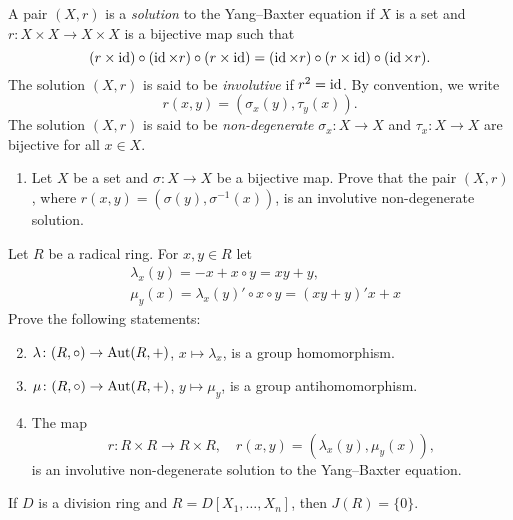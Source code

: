\begin{bonus}
A pair $(X,r)$ is a \emph{solution} to the 
Yang--Baxter equation if $X$ is a set and
$r\colon X\times X\to X\times X$ is a bijective map such that  
\[
	(r\times\operatorname{id})\circ (\operatorname{id}\times r)\circ (r\times\operatorname{id})
	=(\operatorname{id}\times r)\circ (r\times\operatorname{id})\circ (\operatorname{id}\times r).
\]
The solution $(X,r)$ is said to be \emph{involutive} 
if $r^2=\operatorname{id}$. By convention, we write 
\[
	r(x,y)=(\sigma_x(y),\tau_y(x)).
\]
The solution $(X,r)$ is said to be \emph{non-degenerate}  
$\sigma_x\colon X\to X$ and 
$\tau_x\colon X\to X$ are bijective for all $x\in X$.

\begin{enumerate}
    \item Let $X$ be a set and $\sigma\colon X\to X$ be a bijective map. Prove that  
          the pair $(X,r)$, where 
          $r(x,y)=(\sigma(y),\sigma^{-1}(x))$, is an involutive non-degenerate solution. 
\end{enumerate}
Let $R$ be a radical ring. For $x,y\in R$ let 
\begin{align*}
	&\lambda_x(y)=-x+x\circ y=xy+y,\\
	&\mu_y(x)=\lambda_x(y)'\circ x\circ y=(xy+y)'x+x
\end{align*}
Prove the following statements:
\begin{enumerate}
    \setcounter{enumi}{1}
		\item $\lambda\colon (R,\circ)\to\operatorname{Aut}(R,+)$, $x\mapsto
			\lambda_x$, is a group homomorphism.
		\item $\mu\colon (R,\circ)\to\operatorname{Aut}(R,+)$, $y\mapsto\mu_y$,
    		is a group antihomomorphism.
	    \item The map 
    	\[
	        r\colon R\times R\to R\times R,\quad
	        r(x,y)=(\lambda_x(y),\mu_y(x)),
	    \]
	is an involutive non-degenerate solution to the Yang--Baxter equation. 
\end{enumerate}
\end{bonus}


\begin{exercise}
    If $D$ is a division ring and $R=D[X_1,\dots,X_n]$, then
    $J(R)=\{0\}$. 
\end{exercise}


